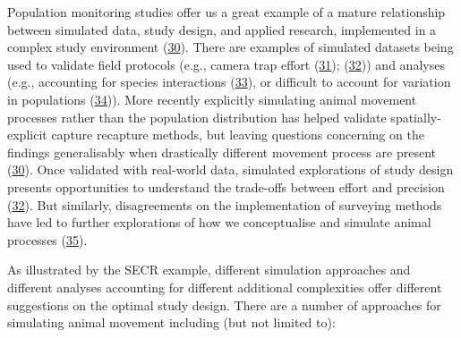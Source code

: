 \documentclass[10pt,a4paper]{article}
\begin{document}
Population monitoring studies offer us a great example of a mature relationship between simulated data, study design, and applied research, implemented in a complex study environment (\protect\hyperlink{ref-theng_confronting_2022}{30}).
There are examples of simulated datasets being used to validate field protocols (e.g., camera trap effort (\protect\hyperlink{ref-howe_distance_2017}{31}); (\protect\hyperlink{ref-cappelle_estimating_2021}{32})) and analyses (e.g., accounting for species interactions (\protect\hyperlink{ref-kellner_two-species_2022}{33}), or difficult to account for variation in populations (\protect\hyperlink{ref-milleret_estimating_2022}{34})).
More recently explicitly simulating animal movement processes rather than the population distribution has helped validate spatially-explicit capture recapture methods, but leaving questions concerning on the findings generalisably when drastically different movement process are present (\protect\hyperlink{ref-theng_confronting_2022}{30}).
Once validated with real-world data, simulated explorations of study design presents opportunities to understand the trade-offs between effort and precision (\protect\hyperlink{ref-cappelle_estimating_2021}{32}).
But similarly, disagreements on the implementation of surveying methods have led to further explorations of how we conceptualise and simulate animal processes (\protect\hyperlink{ref-abolaffio_avoiding_2019}{35}).

As illustrated by the SECR example, different simulation approaches and different analyses accounting for different additional complexities offer different suggestions on the optimal study design.
There are a number of approaches for simulating animal movement including (but not limited to):
\end{document}
